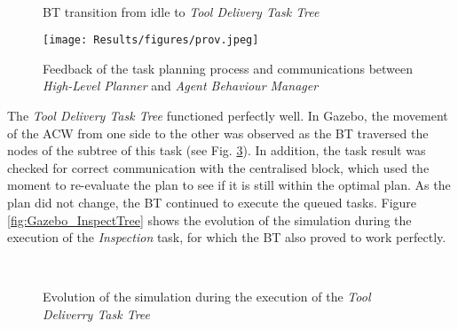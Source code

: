 \begin{figure}[htbp]
    \centering
    \hfill
    \\
        \hfill
    \caption{\gls{BT} transition from idle to \emph{Tool Delivery Task Tree}}
    \label{fig:NoIdle_DeliverToolTaskTree}
\end{figure}

\begin{figure}[htbp]
    \centering
    \texttt{[image: Results/figures/prov.jpeg]}
    \caption{Feedback of the task planning process and communications between \emph{High-Level Planner} and \emph{Agent Behaviour Manager}}
    \label{fig:newtaskqueue}
\end{figure}

The \emph{Tool Delivery Task Tree} functioned perfectly well. In Gazebo, the movement of the \gls{ACW} from one side to the other was observed as the \gls{BT} traversed the nodes of the subtree of this task (see Fig. \ref{fig:Gazebo_DeliverTree}). In addition, the task result was checked for correct communication with the centralised block, which used the moment to re-evaluate the plan to see if it is still within the optimal plan. As the plan did not change, the \gls{BT} continued to execute the queued tasks. Figure \ref{fig:Gazebo_InspectTree} shows the evolution of the simulation during the execution of the \emph{Inspection} task, for which the \gls{BT} also proved to work perfectly.

\begin{figure}[htbp]
    \centering
    \hfill
    \\
        \hfill
    \caption{Evolution of the simulation during the execution of the \emph{Tool Deliverry Task Tree}}
    \label{fig:Gazebo_DeliverTree}
\end{figure}

